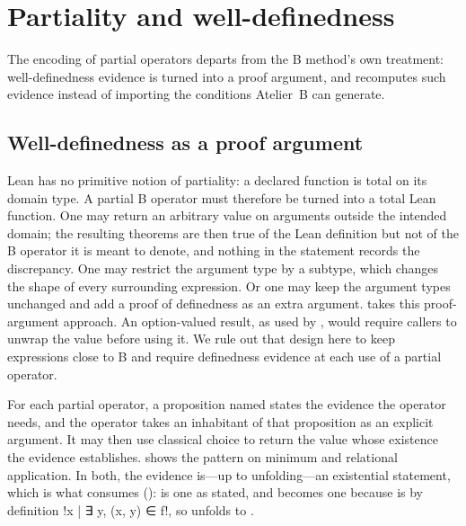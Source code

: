 \section{Partiality and well-definedness}
\label{sec:barrel-wd}

The encoding of partial operators departs from the B method's own treatment:
well-definedness evidence is turned into a proof argument, and \barrel{}
recomputes such evidence instead of importing the conditions Atelier~B can generate.

\subsection{Well-definedness as a proof argument}
\label{subsec:barrel-partial-operators}

Lean has no primitive notion of partiality: a declared function is total on its domain
type.
A partial B operator must therefore be turned into a total Lean function.
One may return an arbitrary value on arguments outside the intended domain; the resulting
theorems are then true of the Lean definition but not of the B operator it is meant to
denote, and nothing in the statement records the discrepancy.
One may restrict the argument type by a subtype, which changes the shape of every
surrounding expression.
Or one may keep the argument types unchanged and add a proof of definedness as an extra
argument.
\barrel{} takes this proof-argument approach.
An option-valued result, as used by \beer{}, would require callers to unwrap the value
before using it. We rule out that design here to keep expressions close to B and require
definedness evidence at each use of a partial operator.

For each partial operator, a proposition named  states the evidence the operator
needs, and the operator takes an inhabitant of that proposition as an explicit argument.
It may then use classical choice to return the value whose existence the evidence
establishes.
 shows the pattern on minimum and relational
application. In both, the evidence is---up to unfolding---an existential statement, which is
what  consumes ():  is one
as stated, and  becomes one because  is by definition
\leaninl!{x | ∃ y, (x, y) ∈ f}!, so  unfolds to
.


